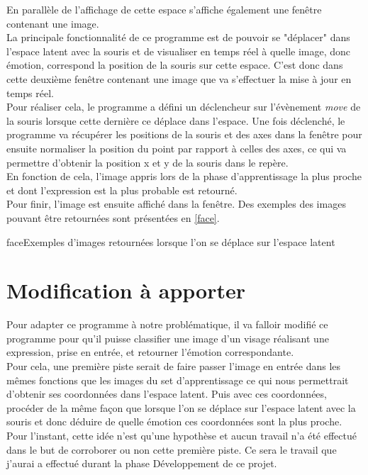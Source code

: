 \documentclass[overfullbox, poster]{polytech/polytech}
\begin{document}
En parallèle de l'affichage de cette espace s'affiche également une fenêtre contenant une image.\\
La principale fonctionnalité de ce programme est de pouvoir se "déplacer" dans l'espace latent avec la souris et de visualiser en temps réel à quelle image, donc émotion, correspond la position de la souris sur cette espace. C'est donc dans cette deuxième fenêtre contenant une image que va s'effectuer la mise à jour en temps réel.\\
Pour réaliser cela, le programme a défini un déclencheur sur l'évènement \textit{move} de la souris lorsque cette dernière ce déplace dans l'espace. Une fois déclenché, le programme va récupérer les positions de la souris et des axes dans la fenêtre pour ensuite normaliser la position du point par rapport à celles des axes, ce qui va permettre d'obtenir la position x et y de la souris dans le repère.\\
En fonction de cela, l'image appris lors de la phase d'apprentissage la plus proche et dont l'expression est la plus probable est retourné.\\
Pour finir, l'image est ensuite affiché dans la fenêtre. Des exemples des images pouvant être retournées sont présentées en \autoref{face}.
\begin{Figure}{face}{Exemples d'images retournées lorsque l'on se déplace sur l'espace latent}
\end{Figure}

\section{Modification à apporter}
Pour adapter ce programme à notre problématique, il va falloir modifié ce programme pour qu'il puisse classifier une image d'un visage réalisant une expression, prise en entrée, et retourner l'émotion correspondante.\\
Pour cela, une première piste serait de faire passer l'image en entrée dans les mêmes fonctions que les images du set d'apprentissage ce qui nous permettrait d'obtenir ses coordonnées dans l'espace latent. Puis avec ces coordonnées, procéder de la même façon que lorsque l'on se déplace sur l'espace latent avec la souris et donc déduire de quelle émotion ces coordonnées sont la plus proche.\\
Pour l'instant, cette idée n'est qu'une hypothèse et aucun travail n'a été effectué dans le but de corroborer ou non cette première piste. Ce sera le travail que j'aurai a effectué durant la phase Développement de ce projet.
\end{document}
